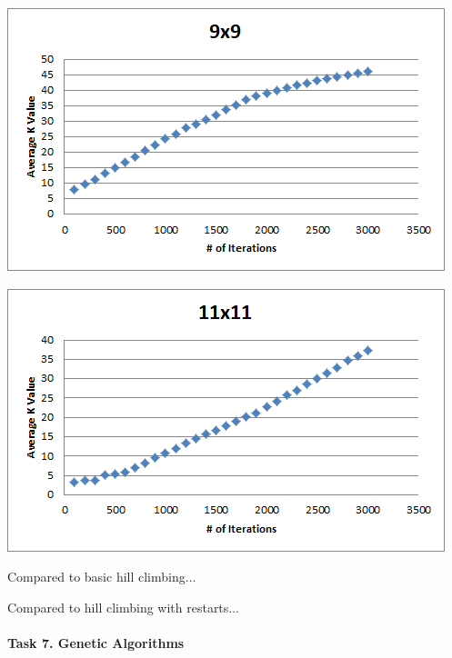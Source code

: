 \documentclass[12pt, letterpaper]{article}
\begin{document}
\includegraphics[width=\linewidth]{"Task 6/9x9 Scatterplot"}

\includegraphics[width=\linewidth]{"Task 6/11x11 Scatterplot"}

Compared to basic hill climbing...

Compared to hill climbing with restarts...

\pagebreak
\paragraph{Task 7. Genetic Algorithms} \mbox{}\\
\end{document}
